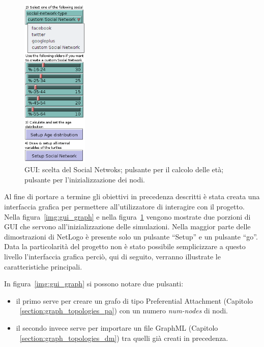 \begin{figure}
  \vspace*{-35pt}
  \begin{center}
    \includegraphics[width=0.28\textwidth]{img/gui-main.png}
  \end{center}
 \vspace*{-10pt}
 \caption{GUI: 
 scelta del Social Netwoks;
 pulsante per il calcolo delle età;
 pulsante per l'inizializzazione dei nodi.}
 \vspace{-20 mm}
 \label{img:gui_main}
\end{figure}

Al fine di portare a termine gli obiettivi in precedenza descritti è stata creata una interfaccia grafica 
per permettere all'utilizzatore di interagire con il progetto.
Nella figura~\ref{img:gui_graph} e nella figura~\ref{img:gui_main} vengono mostrate due porzioni di GUI che servono 
all'inizializzazione delle simulazioni.
Nella maggior parte delle dimostrazioni di NetLogo è presente solo un pulsante ``Setup'' 
e un pulsante ``go''. Data la particolarità del progetto non è stato possibile semplicizzare a questo livello l'interfaccia grafica 
perciò, qui di seguito, verranno illustrate le caratteristiche principali.


In figura~\ref{img:gui_graph} si possono notare due pulsanti:
\begin{itemize}
 \item il primo serve per creare un grafo di tipo Preferential Attachment 
  (Capitolo ~\ref{section:graph_topologies_pa}) con un numero \emph{num-nodes} di nodi.
 \item il secondo invece serve per importare un file GraphML (Capitolo ~\ref{section:graph_topologies_dm}) tra 
  quelli già creati in precedenza.
\end{itemize}


